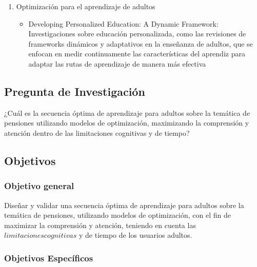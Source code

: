 \documentclass{article}
\begin{document}
\begin{enumerate}
\begin{itemize}
    \end{itemize}
    \item Optimización para el aprendizaje de adultos
    \begin{itemize}
        \item Developing Personalized Education: A Dynamic Framework: Investigaciones sobre educación personalizada, como las revisiones de frameworks dinámicos y adaptativos en la enseñanza de adultos, que se enfocan en medir continuamente las características del aprendiz para adaptar las rutas de aprendizaje de manera más efectiva
    \end{itemize}
\end{enumerate}

\subsection{Pregunta de Investigación}

¿Cuál es la secuencia óptima de aprendizaje para adultos sobre la temática de pensiones utilizando modelos de optimización, maximizando la comprensión y atención dentro de las limitaciones cognitivas y de tiempo?

\subsection{Objetivos}
\subsubsection{Objetivo general}
Diseñar y validar una secuencia óptima de aprendizaje para adultos sobre la temática de pensiones, utilizando modelos de optimización, con el fin de maximizar la comprensión y atención, teniendo en cuenta las $limitaciones cognitivas$ y de tiempo de los usuarios adultos.

\subsubsection{Objetivos Específicos}
\end{document}
